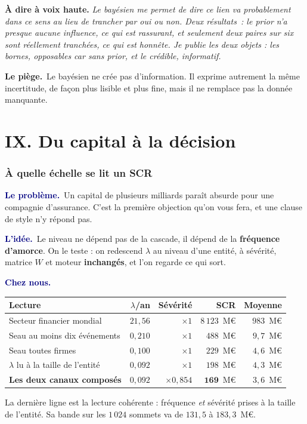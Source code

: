 \documentclass[11pt,a4paper]{article}
\newcommand{\lequoi}[1]{\smallskip\noindent\textcolor{navy}{\textbf{Le problème.}}\ #1\par}
\newcommand{\lidee}[1]{\smallskip\noindent\textcolor{navy}{\textbf{L'idée.}}\ #1\par}
\newcommand{\cheznous}[1]{\smallskip\noindent\textcolor{navy}{\textbf{Chez nous.}}\ #1\par}
\newcommand{\lepiege}[1]{\smallskip\noindent\textcolor{accent}{\textbf{Le piège.}}\ #1\par}
\newcommand{\laphrase}[1]{\begin{phrasebox}\textbf{À dire à voix haute.} \emph{#1}\end{phrasebox}}
\begin{document}
\laphrase{Le bayésien me permet de dire \og ce lien va probablement dans ce sens\fg{} au lieu de
trancher par oui ou non. Deux résultats~: le prior n'a presque aucune influence, ce qui est
rassurant, et seulement deux paires sur six sont réellement tranchées, ce qui est honnête. Je
publie les deux objets : les bornes, opposables car sans prior, et le crédible, informatif.}

\lepiege{Le bayésien ne crée pas d'information. Il exprime autrement la même incertitude, de
façon plus lisible et plus fine, mais il ne remplace pas la donnée manquante.}

\part*{IX. Du capital à la décision}

\section{À quelle échelle se lit un SCR}

\lequoi{Un capital de plusieurs milliards paraît absurde pour une compagnie d'assurance. C'est
la première objection qu'on vous fera, et une clause de style n'y répond pas.}

\lidee{Le niveau ne dépend pas de la cascade, il dépend de la \textbf{fréquence d'amorce}. On le
teste : on redescend $\lambda$ au niveau d'une entité, à sévérité, matrice $W$ et moteur
\textbf{inchangés}, et l'on regarde ce qui sort.}

\cheznous{\;\\[-6pt]
\begin{center}\small
\begin{tabular}{@{}l r r r r@{}}
\toprule
\textbf{Lecture} & $\lambda$/an & \textbf{Sévérité} & \textbf{SCR} & \textbf{Moyenne} \\
\midrule
Secteur financier mondial & $21{,}56$ & $\times1$ & $8\,123$~M\euro & $983$~M\euro \\
Seau \og{}au moins dix événements\fg{} & $0{,}210$ & $\times1$ & $488$~M\euro & $9{,}7$~M\euro \\
Seau \og{}toutes firmes\fg{} & $0{,}100$ & $\times1$ & $229$~M\euro & $4{,}6$~M\euro \\
$\lambda$ lu à la taille de l'entité & $0{,}092$ & $\times1$ & $198$~M\euro & $4{,}3$~M\euro \\
\textbf{Les deux canaux composés} & $0{,}092$ & $\times0{,}854$ & $\mathbf{169}$~M\euro & $3{,}6$~M\euro \\
\bottomrule
\end{tabular}
\end{center}
La dernière ligne est la lecture cohérente : fréquence \emph{et} sévérité prises à la taille de
l'entité. Sa bande sur les $1\,024$ sommets va de $131{,}5$ à $183{,}3$~M\euro.}
\end{document}

